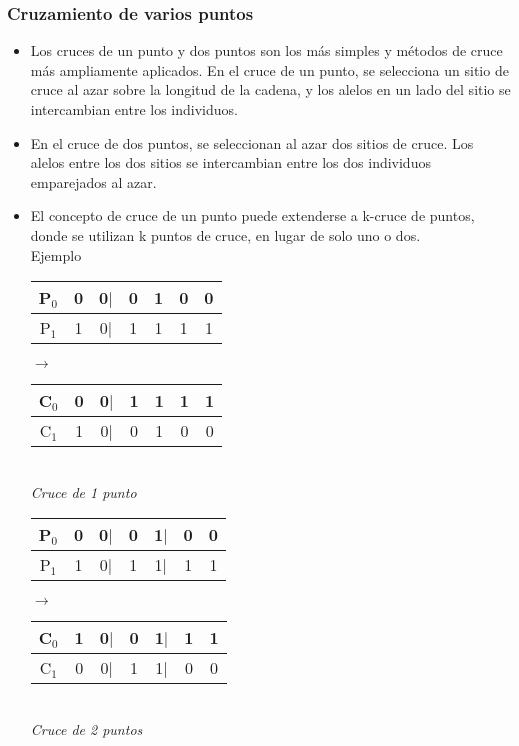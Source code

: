 \documentclass[10pt]{article}
\begin{document}
\subsubsection{Cruzamiento de varios puntos}
\begin{itemize}
  \item Los cruces de un punto y dos puntos son los más simples y métodos de cruce más ampliamente aplicados. En el cruce de un punto, se selecciona un sitio de cruce al azar sobre la longitud de la cadena, y los alelos en un lado del sitio se intercambian entre los individuos.
  \item En el cruce de dos puntos, se seleccionan al azar dos sitios de cruce. Los alelos entre los dos sitios se intercambian entre los dos individuos emparejados al azar.
  \item El concepto de cruce de un punto puede extenderse a k-cruce de puntos, donde se utilizan k puntos de cruce, en lugar de solo uno o dos.
  \\Ejemplo
  \begin{center}
    \begin{tabular}{|c|c|c|c|c|c|c|}
      \hline
      P$_{0}$&0&0$|$&0&1&0&0\\\hline
      P$_{1}$&1&0$|$&1&1&1&1\\\hline
    \end{tabular}
    \(\displaystyle\rightarrow\)
    \begin{tabular}{|c|c|c|c|c|c|c|}
      \hline
      C$_{0}$&0&0$|$&1&1&1&1\\\hline
      C$_{1}$&1&0$|$&0&1&0&0\\\hline
    \end{tabular}
    \\\textit{Cruce de 1 punto}\\\vspace{1cm}
    \begin{tabular}{|c|c|c|c|c|c|c|}
      \hline
      P$_{0}$&0&0$|$&0&1$|$&0&0\\\hline
      P$_{1}$&1&0$|$&1&1$|$&1&1\\\hline
    \end{tabular}
    \(\displaystyle\rightarrow\)
    \begin{tabular}{|c|c|c|c|c|c|c|}
      \hline
      C$_{0}$&1&0$|$&0&1$|$&1&1\\\hline
      C$_{1}$&0&0$|$&1&1$|$&0&0\\\hline
    \end{tabular}
    \\\textit{Cruce de 2 puntos}\\
  \end{center}
\end{itemize}
\clearpage
\end{document}
